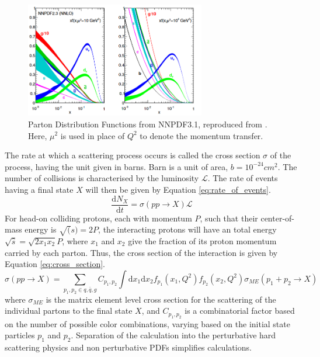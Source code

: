 \documentclass[11pt,a4paper,openright,twoside]{report}
\begin{document}
\begin{figure}[H]
\centering
\includegraphics[width=0.7\textwidth]{NNPDF3.png}
\caption{Parton Distribution Functions from NNPDF3.1, reproduced from \cite{NNPDF}. Here, $\mu^2$ is used in place of $Q^2$ to denote the momentum transfer.}
\label{fig:NNPDF3}
\end{figure}

The rate at which a scattering process occurs is called the cross section $\sigma$ of the process, having the unit given in barns. Barn is a unit of area, $b = 10^{-24}cm^2$. The number of collisions is characterised by the luminosity $\mathcal{L}$. The rate of events having a final state $X$ will then be given by Equation \ref{eq:rate_of_events}.
\begin{equation}
\frac{\text{d}N_X}{\text{d}t} = \sigma(pp\to X)\mathcal{L}
\label{eq:rate_of_events}
\end{equation}
For head-on colliding protons, each with momentum $P$, such that their center-of-mass energy is $\sqrt(s)=2P$, the interacting protons will have an total energy $\sqrt{\hat{s}}=\sqrt{2x_1x_2}P$, where $x_1$ and $x_2$ give the fraction of its proton momentum carried by each parton. Thus, the cross section of the interaction is given by Equation \ref{eq:cross_section}.
\begin{equation}
\sigma(pp\to X) = \sum_{p_1,p_2\in q,\bar{q},g} C_{p_1,p_2}\int\text{d}x_1\text{d}x_2 f_{p_1}(x_1,Q^2)f_{p_2}(x_2,Q^2)\sigma_{ME}(p_1+p_2\to X)
\label{eq:cross_section}
\end{equation}
where $\sigma_{ME}$ is the matrix element level cross section for the scattering of the individual partons to the final state $X$, and $C_{p_1,p_2}$ is a combinatorial factor based on the number of possible color combinations, varying based on the initial state particles $p_1$ and $p_2$. Separation of the calculation into the perturbative hard scattering physics and non perturbative PDFs simplifies calculations.
\end{document}
